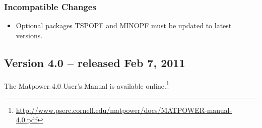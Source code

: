 \documentclass[12pt]{article}
\newcommand{\matpower}[0]{{\sc Matpower}}
\numberwithin{equation}{section}
\numberwithin{table}{section}
\numberwithin{figure}{section}
\begin{document}
\begin{appendices}
\subsubsection*{Incompatible Changes}
\begin{itemize}
\item Optional packages TSPOPF and MINOPF must be updated to latest versions.
\end{itemize}


\subsection{Version 4.0 -- released Feb 7, 2011}
\label{app:v40}

The \href{http://www.pserc.cornell.edu/matpower/docs/MATPOWER-manual-4.0.pdf}{\matpower{} 4.0 User's Manual} is available online.\footnote{\url{http://www.pserc.cornell.edu/matpower/docs/MATPOWER-manual-4.0.pdf}}


\end{appendices}
\end{document}
